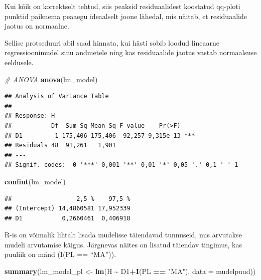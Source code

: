 \documentclass[
]{book}
\newenvironment{Shaded}{\begin{snugshade}}{\end{snugshade}}
\newcommand{\AttributeTok}[1]{\textcolor[rgb]{0.13,0.29,0.53}{#1}}
\newcommand{\CommentTok}[1]{\textcolor[rgb]{0.56,0.35,0.01}{\textit{#1}}}
\newcommand{\FunctionTok}[1]{\textcolor[rgb]{0.13,0.29,0.53}{\textbf{#1}}}
\newcommand{\NormalTok}[1]{#1}
\newcommand{\OtherTok}[1]{\textcolor[rgb]{0.56,0.35,0.01}{#1}}
\newcommand{\SpecialCharTok}[1]{\textcolor[rgb]{0.81,0.36,0.00}{\textbf{#1}}}
\newcommand{\StringTok}[1]{\textcolor[rgb]{0.31,0.60,0.02}{#1}}
\renewenvironment{Shaded} {\begin{snugshade}\footnotesize} {\end{snugshade}}
\begin{document}
Kui kõik on korrektselt tehtud, siis peaksid residuaalidest koostatud qq-ploti punktid paiknema peaaegu ideaalselt joone lähedal, mis näitab, et residuaalide jaotus on normaalne.

Sellise protseduuri abil saad hinnata, kui hästi sobib loodud lineaarne regressioonimudel sinu andmetele ning kas residuaalide jaotus vastab normaalsuse eeldusele.

\begin{Shaded}
\begin{Highlighting}[]
\CommentTok{\# ANOVA}
\FunctionTok{anova}\NormalTok{(lm\_model)}
\end{Highlighting}
\end{Shaded}

\begin{verbatim}
## Analysis of Variance Table
## 
## Response: H
##           Df  Sum Sq Mean Sq F value    Pr(>F)    
## D1         1 175,406 175,406  92,257 9,315e-13 ***
## Residuals 48  91,261   1,901                      
## ---
## Signif. codes:  0 '***' 0,001 '**' 0,01 '*' 0,05 '.' 0,1 ' ' 1
\end{verbatim}

\begin{Shaded}
\begin{Highlighting}[]
\FunctionTok{confint}\NormalTok{(lm\_model)}
\end{Highlighting}
\end{Shaded}

\begin{verbatim}
##                  2,5 %    97,5 %
## (Intercept) 14,4860581 17,952339
## D1           0,2660461  0,406918
\end{verbatim}

R-is on võimalik lihtalt lisada mudelisse täiendavad tunnuseid, mis arvutakse mudeli arvutamise käigus. Järgnevas näites on lisatud täiendav tingimus, kas puuliik on mänd (I(PL == ``MA'')).

\begin{Shaded}
\begin{Highlighting}[]
\FunctionTok{summary}\NormalTok{(lm\_model\_pl }\OtherTok{\textless{}{-}} \FunctionTok{lm}\NormalTok{(H }\SpecialCharTok{\textasciitilde{}}\NormalTok{ D1}\SpecialCharTok{+}\FunctionTok{I}\NormalTok{(PL }\SpecialCharTok{==} \StringTok{"MA"}\NormalTok{), }\AttributeTok{data =}\NormalTok{ mudelpuud))}
\end{Highlighting}
\end{Shaded}
\end{document}
